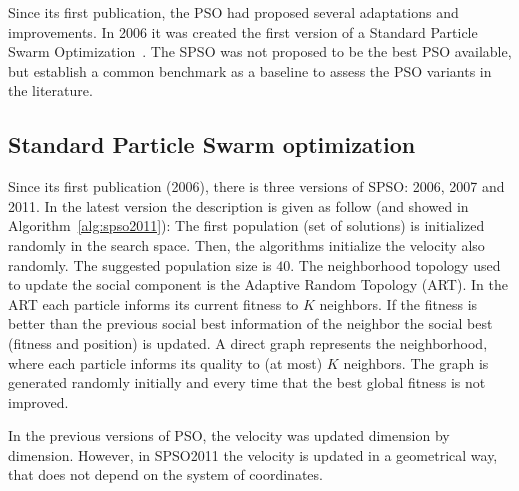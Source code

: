 \documentclass[conference]{IEEEtran}
\begin{document}
    Since its first publication, the PSO had proposed several adaptations and improvements.
    In 2006 it was created the first version of a Standard Particle Swarm Optimization~\cite{SPSO}. The SPSO was not proposed to be the best PSO available, but establish a common benchmark as a baseline to assess the PSO variants in the literature.

    \subsection {Standard Particle Swarm optimization}

    Since its first publication (2006), there is three versions of SPSO: 2006, 2007 and 2011.
    In the latest version the description is given as follow (and showed in Algorithm~\ref{alg:spso2011}):
    The first population (set of solutions) is initialized randomly in the search space. Then, the algorithms initialize the velocity also randomly. The suggested population size is $40$. The neighborhood topology used to update the social component is the Adaptive Random Topology (ART).
    In the ART each particle informs its current fitness to $K$ neighbors. If the fitness is better than the previous social best information of the neighbor the social best (fitness and position) is updated. A direct graph represents the neighborhood, where each particle informs its quality to (at most) $K$ neighbors. The graph is generated randomly initially and every time that the best global fitness is not improved.

    In the previous versions of PSO, the velocity was updated dimension by dimension.
    However, in SPSO2011 the velocity is updated in a geometrical way,  that does not depend on the system of coordinates.
\end{document}
